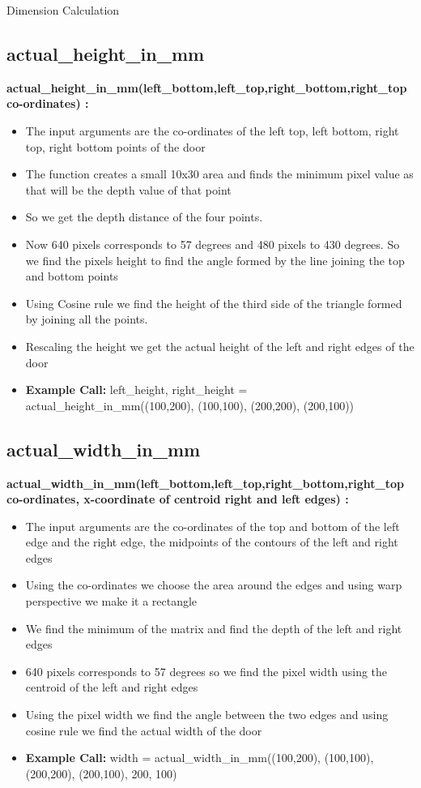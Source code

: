 \documentclass[10pt, a4paper]{beamer}
\begin{document}
\begin{frame}[allowframebreaks]{Dimension Calculation}
  \subsection{actual\_height\_in\_mm}
    \textbf{actual\_height\_in\_mm(left\_bottom,left\_top,right\_bottom,right\_top co-ordinates) : }
      \begin{itemize}
       \item The input arguments are the co-ordinates of the left top, left bottom, right top, right bottom points of the door
       \item The function creates a small 10x30 area and finds the minimum pixel value as that will be the depth value of that point
       \item So we get the depth distance of the four points.
       \item Now 640 pixels corresponds to 57 degrees and 480 pixels to 430 degrees. So we find the pixels height to find the angle formed by the line joining the top and bottom points
       \item Using Cosine rule we find the height of the third side of the triangle formed by joining all the points.
       \item Rescaling the height we get the actual height of the left and right edges of the door
       \item \textbf{Example Call:} left\_height, right\_height = actual\_height\_in\_mm((100,200), (100,100), (200,200), (200,100))
      \end{itemize}
  \framebreak
  \subsection{actual\_width\_in\_mm}
    \textbf{actual\_width\_in\_mm(left\_bottom,left\_top,right\_bottom,right\_top co-ordinates, x-coordinate of centroid right and left edges) : }
      \begin{itemize}
       \item The input arguments are the co-ordinates of the top and bottom of the left edge and the right edge, the midpoints of the contours of the left and right edges
       \item Using the co-ordinates we choose the area around the edges and using warp perspective we make it a rectangle
       \item We find the minimum of the matrix and find the depth of the left and right edges
       \item 640 pixels corresponds to 57 degrees so we find the pixel width using the centroid of the left and right edges
       \item Using the pixel width we find the angle between the two edges and using cosine rule we find the actual width of the door
       \item \textbf{Example Call:} width = actual\_width\_in\_mm((100,200), (100,100), (200,200), (200,100), 200, 100)
      \end{itemize}
  \framebreak

\end{frame}
\end{document}

